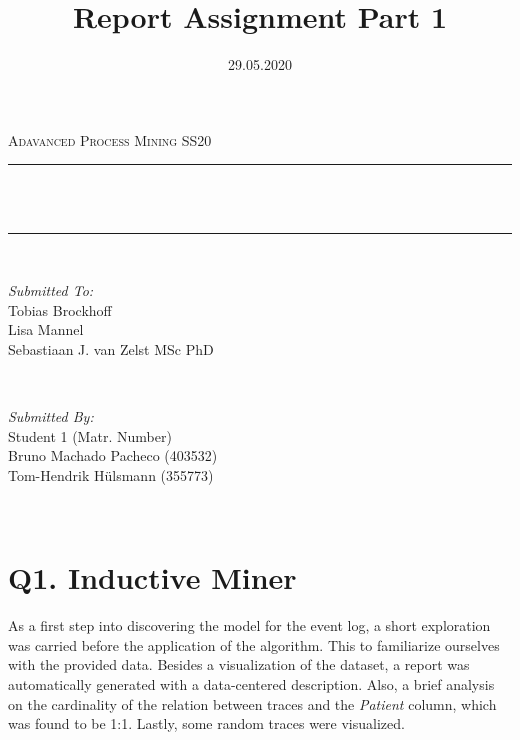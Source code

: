 \documentclass[12pt]{report}
\title{Report Assignment Part 1}
\author{}
\date{29.05.2020}
\makeatletter
\let\thetitle\@title
\makeatother
\begin{document}

\begin{titlepage}
	\centering
    \vspace*{0.5 cm}
  \begin{center}    \textsc{\Large   Adavanced Process Mining SS20}\\[2.0 cm]	\end{center}
	\rule{\linewidth}{0.2 mm} \\[0.4 cm]
	{ \huge \bfseries \thetitle}\\
	\rule{\linewidth}{0.2 mm} \\[1.5 cm]
	
  \begin{minipage}{0.48\textwidth}
    \begin{flushleft} \large
      \emph{Submitted To:}\\
      Tobias Brockhoff\\
      Lisa Mannel\\
      Sebastiaan J. van Zelst MSc PhD\\
    \end{flushleft}
  \end{minipage}~
  \begin{minipage}{0.48\textwidth}
    \begin{flushright} \large
			\emph{Submitted By:} \\
      Student 1 (Matr. Number) \\
      Bruno Machado Pacheco (403532)  \\
      Tom-Hendrik Hülsmann (355773)
		\end{flushright}
	\end{minipage}\\[2 cm]
	
\end{titlepage}


\renewcommand{\thesection}{\arabic{section}}

\section{Q1. Inductive Miner}

As a first step into discovering the model for the event log, a short exploration was carried before the application of the algorithm. This to familiarize ourselves with the provided data. Besides a visualization of the dataset, a report was automatically generated with a data-centered description. Also, a brief analysis on the cardinality of the relation between traces and the \emph{Patient} column, which was found to be 1:1. Lastly, some random traces were visualized.
\end{document}
